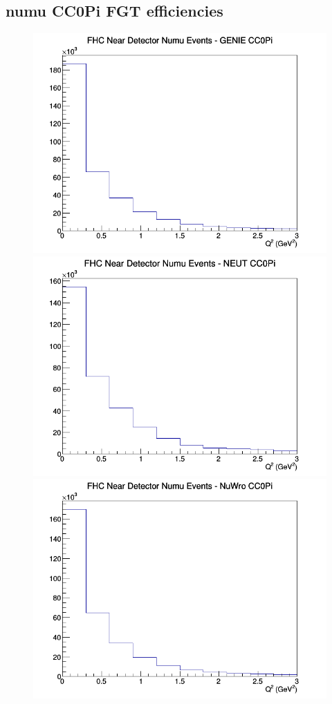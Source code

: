 \subsection{numu CC0Pi FGT efficiencies}
\begin{figure}[h]
\includegraphics[width=\linewidth]{eff_Q2/FGT/CC0Pi_FHC_ND_numu_Q2_GENIE.png}
\endminipage
{}
\includegraphics[width=\linewidth]{eff_Q2/FGT/CC0Pi_FHC_ND_numu_Q2_NEUT.png}
\endminipage
{}
\includegraphics[width=\linewidth]{eff_Q2/FGT/CC0Pi_FHC_ND_numu_Q2_NuWro.png}

\end{figure}
